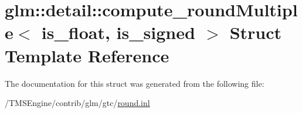 \hypertarget{structglm_1_1detail_1_1compute__round_multiple}{}\section{glm\+:\+:detail\+:\+:compute\+\_\+round\+Multiple$<$ is\+\_\+float, is\+\_\+signed $>$ Struct Template Reference}
\label{structglm_1_1detail_1_1compute__round_multiple}


The documentation for this struct was generated from the following file\+:\begin{DoxyCompactItemize}
\item 
/\+T\+M\+S\+Engine/contrib/glm/gtc/\hyperlink{round_8inl}{round.\+inl}\end{DoxyCompactItemize}
